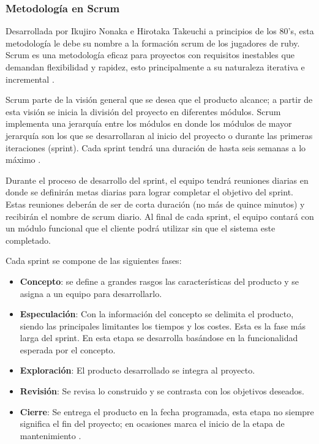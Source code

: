	\subsubsection{Metodología en Scrum}
Desarrollada por Ikujiro Nonaka e Hirotaka Takeuchi a principios de los 80’s, 
esta metodología le debe su nombre a la formación scrum de los jugadores de ruby. 
Scrum es una metodología eficaz para proyectos con requisitos inestables que 
demandan flexibilidad y rapidez, esto principalmente a su naturaleza iterativa 
e incremental \cite{Ref_DefScrum}.  
\\
\par
Scrum parte de la visión general que se desea que el producto alcance; a partir de 
esta visión se inicia la división del proyecto en diferentes módulos. Scrum 
implementa una jerarquía entre los módulos en donde los módulos de mayor jerarquía 
son los que se desarrollaran al inicio del proyecto o durante las primeras 
iteraciones (sprint). Cada sprint tendrá una duración de hasta seis semanas a lo máximo 
\cite{Ref_ScrumRef}. 
\\
\par
Durante el proceso de desarrollo del sprint, el equipo tendrá reuniones diarias 
en donde se definirán metas diarias para lograr completar el objetivo del sprint. 
Estas reuniones deberán de ser de corta duración (no más de quince minutos) y 
recibirán el nombre de scrum diario. Al final de cada sprint, el equipo contará 
con un módulo funcional que el cliente podrá utilizar sin que el sistema este 
completado.
\\
\par
Cada sprint se compone de las siguientes fases:
\begin{itemize}
	\item \textbf{Concepto}: se define a grandes rasgos las características del 
	producto y se asigna a un equipo para desarrollarlo.
	\item \textbf{Especulación}: Con la información del concepto se delimita el 
	producto, siendo las principales limitantes los tiempos y los costes. Esta es 
	la fase más larga del sprint. En esta etapa se desarrolla basándose en la 
	funcionalidad esperada por el concepto.
	\item \textbf{Exploración}: El producto desarrollado se integra al proyecto.
	\item \textbf{Revisión}: Se revisa lo construido y se contrasta con los objetivos 
	deseados.
	\item \textbf{Cierre}: Se entrega el producto en la fecha programada, esta etapa 
	no siempre significa el fin del proyecto; en ocasiones marca el inicio de la etapa 
	de mantenimiento \cite{Ref_ScrumGuia}. 
\end{itemize}
